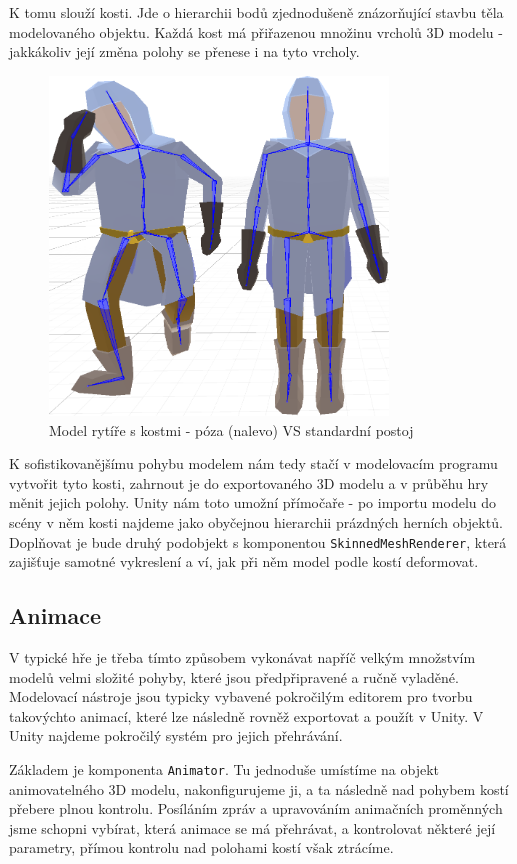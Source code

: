 K tomu slouží kosti. Jde o hierarchii bodů zjednodušeně znázorňující stavbu těla modelovaného objektu. Každá kost má přiřazenou množinu vrcholů 3D modelu - jakkákoliv její změna polohy se přenese i na tyto vrcholy.
\begin{figure}[ht]\centering
    \center
    \includegraphics[width=90mm]{../img/boneAnimationDemo.png}
    \caption{Model rytíře s kostmi - póza (nalevo) VS standardní postoj}
    \label{obr03:animationBones}
\end{figure} 
K sofistikovanějšímu pohybu modelem nám tedy stačí v modelovacím programu vytvořit tyto kosti, zahrnout je do exportovaného 3D modelu a v průběhu hry měnit jejich polohy. Unity nám toto umožní přímočaře - po importu modelu do scény v něm kosti najdeme jako obyčejnou hierarchii prázdných herních objektů. Doplňovat je bude druhý podobjekt s komponentou \texttt{SkinnedMeshRenderer}, která zajišťuje samotné vykreslení a ví, jak při něm model podle kostí deformovat.

\subsection{Animace}

V typické hře je třeba tímto způsobem vykonávat napříč velkým množstvím modelů velmi složité pohyby, které jsou předpřipravené a ručně vyladěné. Modelovací nástroje jsou typicky vybavené pokročilým editorem pro tvorbu takovýchto animací, které lze následně rovněž exportovat a použít v Unity. V Unity najdeme pokročilý systém pro jejich přehrávání. 

Základem je komponenta \texttt{Animator}. Tu jednoduše umístíme na objekt animovatelného 3D modelu, nakonfigurujeme ji, a ta následně nad pohybem kostí přebere plnou kontrolu. Posíláním zpráv a upravováním animačních proměnných jsme schopni vybírat, která animace se má přehrávat, a kontrolovat některé její parametry, přímou kontrolu nad polohami kostí však ztrácíme. 

